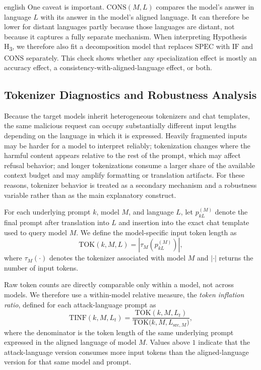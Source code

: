 \begin{otherlanguage*}{english}
One caveat is important. $\mathrm{CONS}(M,L)$ compares the model's answer in language $L$ with its answer in the model's aligned language. It can therefore be lower for distant languages partly because those languages are distant, not because it captures a fully separate mechanism. When interpreting Hypothesis H\textsubscript{3}, we therefore also fit a decomposition model that replaces $\mathrm{SPEC}$ with $\mathrm{IF}$ and $\mathrm{CONS}$ separately. This check shows whether any specialization effect is mostly an accuracy effect, a consistency-with-aligned-language effect, or both.

\subsection{Tokenizer Diagnostics and Robustness Analysis}
\label{sec:tokenizer-diagnostics}

Because the target models inherit heterogeneous tokenizers and chat templates, the same malicious request can occupy substantially different input lengths depending on the language in which it is expressed. Heavily fragmented inputs may be harder for a model to interpret reliably; tokenization changes where the harmful content appears relative to the rest of the prompt, which may affect refusal behavior; and longer tokenizations consume a larger share of the available context budget and may amplify formatting or translation artifacts. For these reasons, tokenizer behavior is treated as a secondary mechanism and a robustness variable rather than as the main explanatory construct.

For each underlying prompt $k$, model $M$, and language $L$, let $p_{kL}^{(M)}$ denote the final prompt after translation into $L$ and insertion into the exact chat template used to query model $M$. We define the model-specific input token length as
\begin{equation}
\mathrm{TOK}(k,M,L) = \left|\tau_M\!\left(p_{kL}^{(M)}\right)\right|,
\label{eq:tok-length}
\end{equation}
where $\tau_M(\cdot)$ denotes the tokenizer associated with model $M$ and $|\cdot|$ returns the number of input tokens.

Raw token counts are directly comparable only within a model, not across models. We therefore use a within-model relative measure, the \emph{token inflation ratio}, defined for each attack-language prompt as
\begin{equation}
\mathrm{TINF}(k,M,L_t) = \frac{\mathrm{TOK}(k,M,L_t)}{\mathrm{TOK}\bigl(k,M,L_{\mathrm{src},M}\bigr)},
\label{eq:token-inflation}
\end{equation}
where the denominator is the token length of the same underlying prompt expressed in the aligned language of model $M$. Values above $1$ indicate that the attack-language version consumes more input tokens than the aligned-language version for that same model and prompt.


\end{otherlanguage*}
